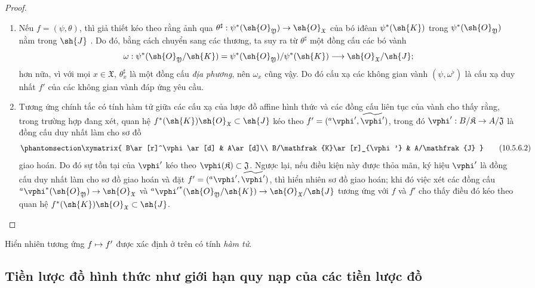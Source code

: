 \documentclass[oneside]{amsart}
\makeatletter
\newcommand{\ega@arrow}[2]{\mathchoice{#1}{#2}{#2}{#2}}
\let\ega@shortmapsto\mapsto
\renewcommand{\to}{\ega@arrow{\longrightarrow}{\rightarrow}}
\renewcommand{\mapsto}{\ega@arrow{\longmapsto}{\ega@shortmapsto}}
\let\EGAOriginalLabel\label
\renewcommand{\label}[1]{\phantomsection\EGAOriginalLabel{#1}}
\makeatother
\begin{document}
\begin{proof}
\medskip\noindent
\begin{enumerate}
  \item[\rm{(i)}] Nếu $f=(\psi,\theta)$, thì giả thiết kéo theo rằng ảnh qua $\theta^\sharp:\psi^*(\sh{O}_\mathfrak{Y})\to\sh{O}_\mathfrak{X}$ của bó iđêan $\psi^*(\sh{K})$ trong $\psi^*(\sh{O}_\mathfrak{Y})$ nằm trong $\sh{J}$ .
    Do đó, bằng cách chuyển sang các thương, ta suy ra từ $\theta^\sharp$ một đồng cấu các bó vành
    \[
      \omega:\psi^*(\sh{O}_\mathfrak{Y}/\sh{K})=\psi^*(\sh{O}_\mathfrak{Y})/\psi^*(\sh{K})\to\sh{O}_\mathfrak{X}/\sh{J};
    \]
    hơn nữa, vì với mọi $x\in\mathfrak{X}$, $\theta_x^\sharp$ là một đồng cấu \emph{địa phương}, nên $\omega_x$ cũng vậy.
    Do đó cấu xạ các không gian vành $(\psi,\omega^\flat)$ là  cấu xạ duy nhất $f'$ của các không gian vành đáp ứng yêu cầu.
  \item[\rm{(ii)}] Tương ứng chính tắc có tính hàm tử giữa các cấu xạ của lược đồ affine hình thức và các đồng cấu liên tục của vành  cho thấy rằng, trong trường hợp đang xét, quan hệ $f^*(\sh{K})\sh{O}_\mathfrak{X}\subset\sh{J}$ kéo theo $f'=({}^a\vphi',\widetilde{\vphi'})$, trong đó $\vphi':B/\mathfrak{K}\to A/\mathfrak{J}$ là đồng cấu duy nhất làm cho sơ đồ
    \[
    \label{I.10.5.6.2}
      \xymatrix{
        B\ar[r]^\vphi\ar[d] &
        A\ar[d]\\
        B/\mathfrak{K}\ar[r]_{\vphi'} &
        A/\mathfrak{J}
      }
      \tag{10.5.6.2}
    \]
    giao hoán.
    Do đó sự tồn tại của $\vphi'$ kéo theo $\vphi(\mathfrak{K})\subset\mathfrak{J}$.
    Ngược lại, nếu điều kiện này được thỏa mãn, ký hiệu $\vphi'$ là đồng cấu duy nhất làm cho sơ đồ  giao hoán và đặt $f'=({}^a\vphi',\widetilde{\vphi'})$, thì hiển nhiên sơ đồ  giao hoán; khi đó việc xét các đồng cấu ${}^a\vphi^*(\sh{O}_\mathfrak{Y})\to\sh{O}_\mathfrak{X}$ và ${}^a{\vphi'}^*(\sh{O}_\mathfrak{Y}/\sh{K})\to\sh{O}_\mathfrak{X}/\sh{J}$ tương ứng với $f$ và $f'$ cho thấy điều đó kéo theo quan hệ $f^*(\sh{K})\sh{O}_\mathfrak{X}\subset\sh{J}$.
\end{enumerate}
\end{proof}

Hiển nhiên tương ứng $f\mapsto f'$ được xác định ở trên có tính \emph{hàm tử}.

\subsection{Tiền lược đồ hình thức như giới hạn quy nạp của các tiền lược đồ}
\label{subsection:I.10.6}
\end{document}

